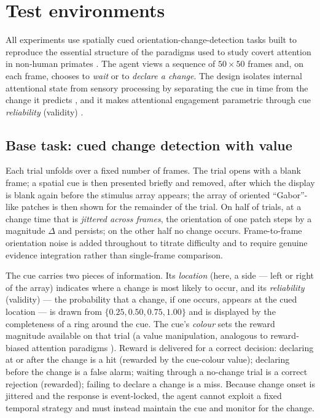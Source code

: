 \section{Test environments}
\label{sec:env}

All experiments use spatially cued orientation-change-detection tasks built to
reproduce the essential structure of the paradigms used to study covert attention
in non-human primates \citep{posner1980attention, cohen2009attention,
herman2017color, srinath2021attention}. The agent views a sequence of
$50\times50$ frames and, on each frame, chooses to \emph{wait} or to \emph{declare
a change}. The design isolates internal attentional state from sensory processing
by separating the cue in time from the change it predicts \citep{posner1980attention,
muller1987spatial}, and it makes attentional engagement parametric through cue
\emph{reliability} (validity) \citep{mayo2016graded}.

\subsection{Base task: cued change detection with value}
\label{sec:env-base}
Each trial unfolds over a fixed number of frames. The trial opens with a blank
frame; a spatial cue is then presented briefly and removed, after which the display
is blank again before the stimulus array appears; the array of oriented
``Gabor''-like patches is then shown for the remainder of the trial. On half of
trials, at a change time that is \emph{jittered across frames}, the orientation of
one patch steps by a magnitude $\Delta$ and persists; on the other half no change
occurs. Frame-to-frame orientation noise is added throughout to titrate difficulty
and to require genuine evidence integration rather than single-frame comparison.

The cue carries two pieces of information. Its \emph{location} (here, a side ---
left or right of the array) indicates where a change is most likely to occur, and
its \emph{reliability} (validity) --- the probability that a change, if one occurs,
appears at the cued location --- is drawn from $\{0.25, 0.50, 0.75, 1.00\}$ and is
displayed by the completeness of a ring around the cue. The cue's \emph{colour}
sets the reward magnitude available on that trial (a value manipulation, analogous
to reward-biased attention paradigms \citep{stanisor2013neural, baruni2015reward,
maunsell2004neuronal}). Reward is delivered for a correct decision: declaring at or
after the change is a hit (rewarded by the cue-colour value); declaring before the
change is a false alarm; waiting through a no-change trial is a correct rejection
(rewarded); failing to declare a change is a miss. Because change onset is jittered
and the response is event-locked, the agent cannot exploit a fixed temporal
strategy and must instead maintain the cue and monitor for the change.

